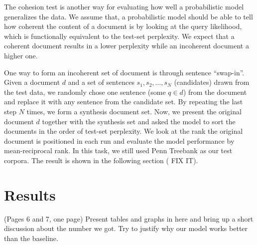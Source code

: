 The cohesion test is another way for evaluating how well a probabilistic model
generalizes the data.  We assume that, a probabilistic model should be able to
tell how coherent the content of a document is by looking at the query
likelihood, which is functionally equivalent to the test-set perplexity.  We
expect that a coherent document results in a lower perplexity while an
incoherent document a higher one.  

One way to form an incoherent set of document is through sentence ``swap-in''.
Given a document $d$ and a set of sentences ${ s_1, s_2, \ldots, s_N }$
(candidates) drawn from the test data, we randomly chose one sentence (some $q
\in d$) from the document and replace it with any sentence from the candidate
set.  By repeating the last step $N$ times, we form a synthesis document set.
Now, we present the original document $d$ together with the synthesis set and
asked the model to sort the documents in the order of test-set perplexity.  We
look at the rank the original document is positioned in each run and evaluate
the model performance by mean-reciprocal rank.  In this task, we still used
Penn Treebank as our test corpora.  The result is shown in the following
section ({\color{red} FIX IT}).

% 
% 
% 


\section{Results} { \color{red} (Pages 6 and 7, one page) Present tables and graphs in
here and bring up a short discussion about the number we got.  Try to justify
why our model works better than the baseline. }

